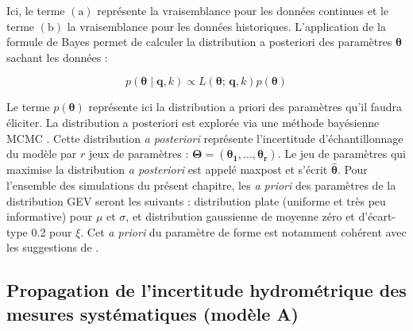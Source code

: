 			Ici, le terme \textit{$\mathrm{(a)}$} représente la vraisemblance pour les données continues et le terme \textit{$\mathrm{(b)}$} la vraisemblance pour les données historiques. L'application de la formule de Bayes permet de calculer la distribution a posteriori des paramètres $\boldsymbol{\theta}$ sachant les données :
			
			\begin{equation}
				p(\boldsymbol{\theta} \mid \boldsymbol{q},k) \propto L(\boldsymbol{\theta};\,\boldsymbol{q},k) p(\boldsymbol{\theta})
				\label{eq:BayesBinom}
			\end{equation}
	
		Le terme $p(\boldsymbol{\theta})$ représente ici la distribution a priori des paramètres qu'il faudra éliciter. La distribution a posteriori est explorée via une méthode bayésienne MCMC \citep{renard_application_2006}. Cette distribution \textit{a posteriori} représente l'incertitude d'échantillonnage du modèle par $r$ jeux de paramètres : $\boldsymbol{\Theta} = (\boldsymbol{\theta_1},...,\boldsymbol{\theta_r})$. Le jeu de paramètres qui maximise la distribution \textit{a posteriori} est appelé maxpost et s'écrit $\boldsymbol{ \hat{\theta} }$. Pour l'ensemble des simulations du présent chapitre, les \textit{a priori} des paramètres de la distribution GEV seront les suivants : distribution plate (uniforme et très peu informative) pour $\mu$ et $\sigma$, et distribution gaussienne de moyenne zéro et d'écart-type 0.2 pour $\xi$. Cet \textit{a priori} du paramètre de forme est notamment cohérent avec les suggestions de \citet{martins_generalized_2000}.
	
	

	
	\subsection{Propagation de l'incertitude hydrométrique des mesures systématiques (modèle A)}
	\label{subsec:modA}
	
